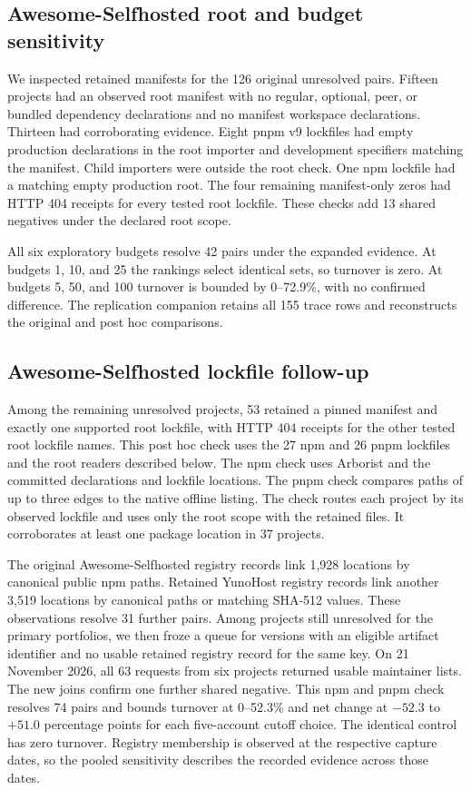 \subsection{Awesome-Selfhosted root and budget sensitivity}
We inspected retained manifests for the 126 original unresolved pairs.
Fifteen projects had an observed root manifest with no regular, optional,
peer, or bundled dependency declarations and no manifest workspace declarations.
Thirteen had corroborating evidence. Eight pnpm v9 lockfiles had empty
production declarations in the root importer and development specifiers
matching the manifest. Child importers were outside the root check.
One npm lockfile had a matching empty production root. The four remaining
manifest-only zeros had HTTP 404 receipts for every tested root lockfile.
These checks add 13 shared negatives under the declared root scope.

All six exploratory budgets resolve 42 pairs under the expanded evidence.
At budgets 1, 10, and 25 the rankings select identical sets, so turnover
is zero. At budgets 5, 50, and 100 turnover is bounded by 0--72.9\%,
with no confirmed difference. The replication companion retains all 155
trace rows and reconstructs the original and post hoc comparisons.

\subsection{Awesome-Selfhosted lockfile follow-up}
Among the remaining unresolved projects, 53 retained a pinned manifest
and exactly one supported root lockfile, with HTTP 404 receipts for the
other tested root lockfile names. This post hoc check uses the 27 npm and
26 pnpm lockfiles and the root readers described below. The npm check uses
Arborist and the committed declarations and lockfile locations. The pnpm
check compares paths of up to three edges to the native offline listing.
The check routes each project by its observed lockfile and uses only the
root scope with the retained files. It corroborates at least one package
location in 37 projects.

The original Awesome-Selfhosted registry records link 1,928 locations by
canonical public npm paths. Retained YunoHost registry records link another
3,519 locations by canonical paths or matching SHA-512 values. These
observations resolve 31 further pairs. Among projects still unresolved for
the primary portfolios, we then froze a queue for versions with an eligible
artifact identifier and no usable retained registry record for the same key.
On 21 November 2026, all 63 requests from six projects returned usable
maintainer lists. The new joins confirm one further shared negative.
This npm and pnpm check resolves 74 pairs and bounds turnover at 0--52.3\%
and net change at $-52.3$ to $+51.0$ percentage points for each five-account
cutoff choice. The identical control has zero turnover. Registry membership
is observed at the respective capture dates, so the pooled sensitivity
describes the recorded evidence across those dates.

